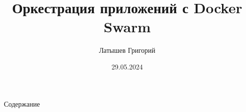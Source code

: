 \documentclass[
	10pt,
	xcolor=x11names,
	aspectratio=169,
]{beamer}
\title{Оркестрация приложений с Docker Swarm}
\author{Латышев Григорий}
\date{29.05.2024}
\begin{document}
\frame[plain]{\titlepage}

\begin{frame}{Содержание}

	\tableofcontents
\end{frame}






\end{document}
